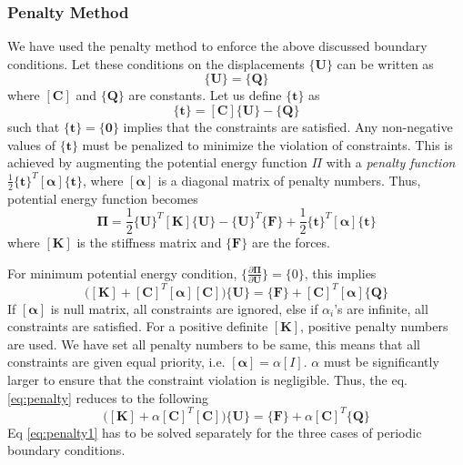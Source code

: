 \documentclass[10pt]{article}
\newcommand{\e}[1]{\textbf{#1}}
\begin{document}
\subsubsection{Penalty Method}
\label{sec:pbc}
We have used the penalty method to enforce the above discussed boundary conditions. Let these conditions on the displacements $\{\e U\}$ can be written as
\begin{equation*}
[\textbf{C}]\{\textbf{U}\} = \{\textbf{Q}\}
\end{equation*}
where $[\textbf{C}]$ and $\{\textbf{Q}\}$ are constants. Let us define $\{\textbf{t}\}$ as
\begin{equation*}
\{\textbf{t}\} = [\textbf{C}]\{\textbf{U}\} - \{\textbf{Q}\}
\end{equation*}
such that $\{\textbf{t}\} = \{\textbf{0}\}$ implies that the constraints are satisfied. Any non-negative values of $\{\textbf{t}\}$ must be penalized to minimize the violation of constraints. This is achieved by augmenting the potential energy function\cite{Book:Cook} $\Pi$ with a \textit{penalty function} $\frac{1}{2}\{\textbf{t}\}^T[\bm\alpha]\{\textbf{t}\}$, where $[\bm\alpha]$ is a diagonal matrix of penalty numbers. Thus, potential energy function becomes
\begin{equation}
\bm\Pi = \frac{1}{2}\{\e U\}^T[\e K]\{\e U\} - \{\e U\}^T\{\e F\} + \frac{1}{2}\{\textbf{t}\}^T[\bm\alpha]\{\textbf{t}\}
\end{equation}
where $[\e K]$ is the stiffness matrix and $\{\e F\}$ are the forces.\par
For minimum potential energy condition, $\{\frac{\partial\bm\Pi}{\partial\e U}\} = \{0\}$, this implies
\begin{equation}
\label{eq:penalty}
\bigg([\e K]+[\e C]^T[\bm\alpha][\e C]\bigg)\{\e U\} = \{\e F\} + [\e C]^T[\bm\alpha]\{\e Q\}
\end{equation}
If $[\bm\alpha]$ is null matrix, all constraints are ignored, else if $\alpha_i$'s are infinite, all constraints are satisfied. For a positive definite $[\e K]$, positive penalty numbers are used. We have set all penalty numbers to be same, this means that all constraints are given equal priority, i.e. $[\bm\alpha] = \alpha[I]$. $\alpha$ must be significantly larger to ensure that the constraint violation is negligible. Thus, the eq. \eqref{eq:penalty} reduces to the following
\begin{equation}
\label{eq:penalty1}
\bigg([\e K]+\alpha[\e C]^T[\e C]\bigg)\{\e U\} = \{\e F\} + \alpha[\e C]^T\{\e Q\}
\end{equation}
Eq \eqref{eq:penalty1} has to be solved separately for the three cases of periodic boundary conditions.
\end{document}
